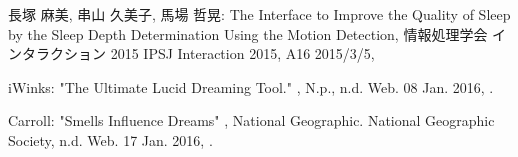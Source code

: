 \begin{bib}[100]
\begin{flushleft}
  長塚 麻美, 串山 久美子, 馬場 哲晃:
  \newblock  The Interface to Improve the Quality of Sleep by the Sleep Depth Determination Using the Motion Detection,
  \newblock 情報処理学会 インタラクション 2015 IPSJ Interaction 2015,
  \newblock  A16 2015/3/5,
\end{flushleft}

\begin{flushleft}
iWinks:
 \newblock  "The Ultimate Lucid Dreaming Tool." ,
  \newblock N.p., n.d. Web. 08 Jan. 2016,
  .
\end{flushleft}

\begin{flushleft}
Carroll:
 \newblock  "Smells Influence Dreams" ,
  \newblock National Geographic. National Geographic Society, n.d. Web. 17 Jan. 2016,
  .
\end{flushleft}

\end{bib}
